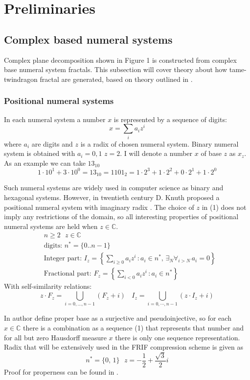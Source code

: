 \newpage
\section{Preliminaries}

\subsection{Complex based numeral systems}
Complex plane decomposition shown in Figure 1 is constructed from complex base numeral system fractals.
This subsection will cover theory about how tame-twindragon fractal are generated, based on
theory outlined in \cite{duda2008combase}.

\subsubsection{Positional numeral systems}
In each numeral system a number $x$ is represented by a sequence of digits:
\begin{equation}
    x = \sum_i a_iz^i 
\end{equation}
where $a_i$ are digits and $z$ is a radix of chosen numeral system. 
Binary numeral system is obtained with $a_i={0,1}\,\,z=2$. I will denote a number $x$ of base $z$ as $x_z$. As an example we can take $13_{10}$
\[
    1\cdot10^1 + 3\cdot10^0= 13_{10} = 1101_2 = 1\cdot2^3 + 1\cdot2^2 + 0\cdot2^1 + 1\cdot2^0
\]

Such numeral systems are widely used in computer science as binary and hexagonal systems.
However, in twentieth century D. Knuth proposed a positional numeral system with imaginary radix \cite{knuth1960imag}. The choice of 
$z$ in (1) does not imply any restrictions of the domain, so all interesting properties of positional numeral systems are held when $z\in\mathbb{C}$.
\begin{align*}
    &n \geq 2\,\,\,\, z \in \mathbb{C}\\
    &\text{digits: } n^* = \{0..n-1\}\,\,\\
    &\text{Integer part: } I_z = \left\{ \sum_{i\geq0}a_iz^i\,: a_i\in n^*,\, \exists_N\forall_{i>N}\, a_i = 0 \right\}\\
    &\text{Fractional part: } F_z = \left\{ \sum_{i<0}a_iz^i\,: a_i\in n^*\right\} 
\end{align*}
With self-similarity relations:
\[
    z\cdot F_z = \bigcup_{i=0,\dots,n-1}(F_z + i) \ \ \ \ I_z = \bigcup_{i=0,\cdots,n-1}(z\cdot I_z + i)
\]

In \cite{duda2008combase} author define proper base as a surjective and pseudoinjective,
so for each $x\in \mathbb{C}$ there is a combination as a sequence (1) that represents that number
and for all but zero Hausdorff measure $x$ there is only one sequence representation.
Radix that will be extensively used in the FRIF compression scheme is given as
\begin{equation}
    n^* = \{0,\,1\}\ \ \
    z = -\frac{1}{2} + \frac{\sqrt{3}}{2}i 
\end{equation}
Proof for properness can be found in \cite{duda2008combase}.

